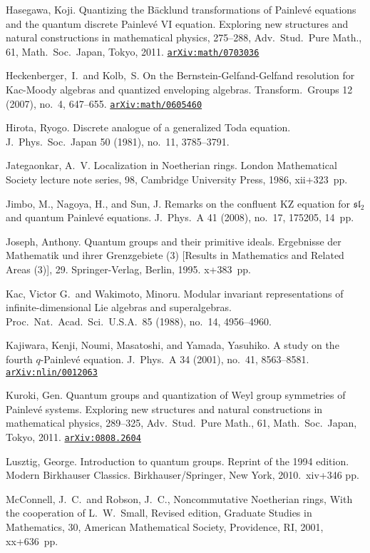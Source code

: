 \documentclass[12pt,twoside]{article}
\newcommand\arxivref[1]{\href{http://arxiv.org/abs/#1}{\tt arXiv:#1}}
\theoremstyle{plain} %
\theoremstyle{definition} %
\theoremstyle{definition} %
\numberwithin{theorem}{section}
\numberwithin{equation}{section}
\numberwithin{figure}{section}
\numberwithin{table}{section}
\begin{document}
\begin{thebibliography}{99}
Hasegawa, Koji. 
Quantizing the B\"acklund transformations of Painlev\'e equations 
and the quantum discrete Painlev\'e VI equation. 
Exploring new structures and natural constructions in mathematical physics, 275--288, 
Adv.\ Stud.\ Pure Math., 61, Math.\ Soc.\ Japan, Tokyo, 2011.
\arxivref{math/0703036}

Heckenberger,~I.\ and Kolb,~S. 
On the Bernstein-Gelfand-Gelfand resolution for Kac-Moody algebras 
and quantized enveloping algebras. 
Transform.\ Groups 12 (2007), no.~4, 647--655.
\arxivref{math/0605460}

Hirota, Ryogo.
Discrete analogue of a generalized Toda equation. 
J.\ Phys.\ Soc.\ Japan 50 (1981), no.~11, 3785--3791. 

Jategaonkar, A.~V.
Localization in Noetherian rings.
London Mathematical Society lecture note series, 98, 
Cambridge University Press, 1986, xii+323~pp.

Jimbo, M., Nagoya, H., and  Sun, J. 
Remarks on the confluent KZ equation for $\mathfrak{sl}_2$ 
and quantum Painlev\'e equations. 
J.\ Phys.\ A 41 (2008), no.~17, 175205, 14~pp. 

Joseph, Anthony.
Quantum groups and their primitive ideals.
Ergebnisse der Mathematik und ihrer Grenzgebiete (3) 
[Results in Mathematics and Related Areas (3)], 29. 
Springer-Verlag, Berlin, 1995. x+383~pp. 

Kac, Victor G.\ and Wakimoto, Minoru.
Modular invariant representations of infinite-dimensional Lie algebras and superalgebras.
Proc.\ Nat.\ Acad.\ Sci.\ U.S.A.\ 85 (1988), no.~14, 4956--4960.

Kajiwara, Kenji, Noumi, Masatoshi, and Yamada, Yasuhiko. 
A study on the fourth $q$-Painlev\'e equation. 
J.\ Phys.\ A 34 (2001), no.~41, 8563–8581.
\arxivref{nlin/0012063}

Kuroki, Gen.
Quantum groups and quantization of Weyl group symmetries of Painlev\'e systems. 
Exploring new structures and natural constructions in mathematical physics, 
289--325, Adv.\ Stud.\ Pure Math., 61, Math.\ Soc.\ Japan, Tokyo, 2011.
\arxivref{0808.2604}

Lusztig, George. 
Introduction to quantum groups. 
Reprint of the 1994  edition.  
Modern Birkhauser Classics. 
Birkhauser/Springer, New York, 2010.\ xiv+346 pp. 

McConnell, J.~C.\ and Robson, J.~C., 
Noncommutative Noetherian rings,
With the cooperation of L.~W.~Small, 
Revised edition, 
Graduate Studies in Mathematics, 30, 
American Mathematical Society, Providence, RI, 2001, xx+636~pp.


\end{thebibliography}
\end{document}
